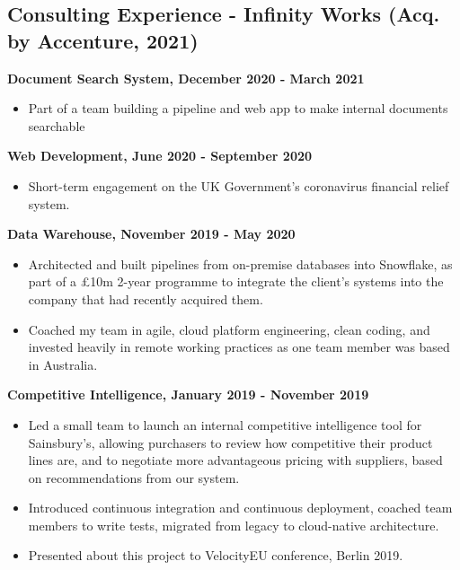 \documentclass[a4paper]{scrartcl}
\begin{document}
\subsection*{Consulting Experience - Infinity Works (Acq. by Accenture, 2021)}
\textbf{Document Search System, December 2020 - March 2021}
\begin{itemize}
      \item Part of a team building a pipeline and web app to make internal
            documents searchable
\end{itemize}

\textbf{Web Development, June 2020 - September 2020}
\begin{itemize}
      \item Short-term engagement on the UK Government's coronavirus financial
            relief system.
\end{itemize}

\textbf{Data Warehouse, November 2019 - May 2020}
\begin{itemize}
      \item Architected and built pipelines from on-premise databases into
            Snowflake, as part of a £10m 2-year programme to integrate the
            client's systems into the company that had recently acquired them.
      \item Coached my team in agile, cloud platform engineering, clean coding,
            and invested heavily in remote working practices as one team member
            was based
            in Australia.
\end{itemize}

\textbf{Competitive Intelligence, January 2019 - November 2019}
\begin{itemize}
      \item Led a small team to launch an internal competitive intelligence
            tool
            for Sainsbury's, allowing purchasers to review how competitive
            their
            product lines are, and to negotiate more advantageous pricing with
            suppliers,
            based on recommendations from our system.
      \item Introduced continuous integration and continuous deployment,
            coached
            team members to write tests, migrated from legacy to cloud-native
            architecture.
      \item Presented about this project to VelocityEU conference, Berlin 2019.
\end{itemize}
\end{document}
